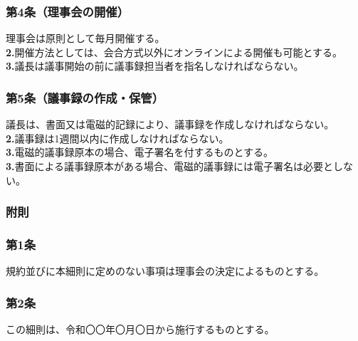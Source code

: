 \documentclass[12pt,uplatex]{jsarticle}
\begin{document}
\subsubsection*{ 第4条（理事会の開催）}
理事会は原則として毎月開催する。\\
\textbf{2.}開催方法としては、会合方式以外にオンラインによる開催も可能とする。\\
\textbf{3.}議長は議事開始の前に議事録担当者を指名しなければならない。\\

\subsubsection*{ 第5条（議事録の作成・保管）}
議長は、書面又は電磁的記録により、議事録を作成しなければならない。\\
\textbf{2.}議事録は1週間以内に作成しなければならない。\\
\textbf{3.}電磁的議事録原本の場合、電子署名を付するものとする。\\
\textbf{3.}書面による議事録原本がある場合、電磁的議事録には電子署名は必要としない。\\


\begin{center}
\subsubsection*{附則}
\end{center}
\subsubsection*{第1条}
規約並びに本細則に定めのない事項は理事会の決定によるものとする。
\subsubsection*{第2条}
この細則は、令和〇〇年〇月〇日から施行するものとする。
\end{document}
